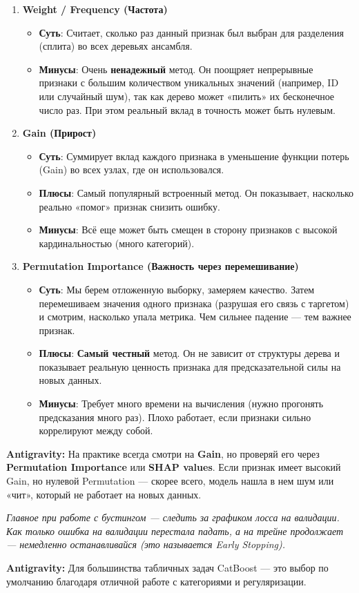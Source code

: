 \documentclass[12pt]{article}
\newcommand{\commentary}[1]{{\small\itshape\color{commentgray} #1}}
\newcommand{\antigravity}[1]{{\small\color{antigravityblue}\textbf{Antigravity:} #1}}
\begin{document}
\begin{enumerate}[label=\arabic*., leftmargin=*]
    \item \textbf{Weight / Frequency (Частота)}
    \begin{itemize}
        \item \textbf{Суть}: Считает, сколько раз данный признак был выбран для разделения (сплита) во всех деревьях ансамбля.
        \item \textbf{Минусы}: Очень \textbf{ненадежный} метод. Он поощряет непрерывные признаки с большим количеством уникальных значений (например, ID или случайный шум), так как дерево может «пилить» их бесконечное число раз. При этом реальный вклад в точность может быть нулевым.
    \end{itemize}

    \item \textbf{Gain (Прирост)}
    \begin{itemize}
        \item \textbf{Суть}: Суммирует вклад каждого признака в уменьшение функции потерь (Gain) во всех узлах, где он использовался.
        \item \textbf{Плюсы}: Самый популярный встроенный метод. Он показывает, насколько реально «помог» признак снизить ошибку.
        \item \textbf{Минусы}: Всё еще может быть смещен в сторону признаков с высокой кардинальностью (много категорий).
    \end{itemize}

    \item \textbf{Permutation Importance (Важность через перемешивание)}
    \begin{itemize}
        \item \textbf{Суть}: Мы берем отложенную выборку, замеряем качество. Затем перемешиваем значения одного признака (разрушая его связь с таргетом) и смотрим, насколько упала метрика. Чем сильнее падение — тем важнее признак.
        \item \textbf{Плюсы}: \textbf{Самый честный} метод. Он не зависит от структуры дерева и показывает реальную ценность признака для предсказательной силы на новых данных.
        \item \textbf{Минусы}: Требует много времени на вычисления (нужно прогонять предсказания много раз). Плохо работает, если признаки сильно коррелируют между собой.
    \end{itemize}
\end{enumerate}

\antigravity{На практике всегда смотри на \textbf{Gain}, но проверяй его через \textbf{Permutation Importance} или \textbf{SHAP values}. Если признак имеет высокий Gain, но нулевой Permutation — скорее всего, модель нашла в нем шум или «чит», который не работает на новых данных.}

\vspace{1cm}
\commentary{Главное при работе с бустингом — следить за графиком лосса на валидации. Как только ошибка на валидации перестала падать, а на трейне продолжает — немедленно останавливайся (это называется Early Stopping).}

\antigravity{Для большинства табличных задач CatBoost — это выбор по умолчанию благодаря отличной работе с категориями и регуляризации.}
\end{document}

